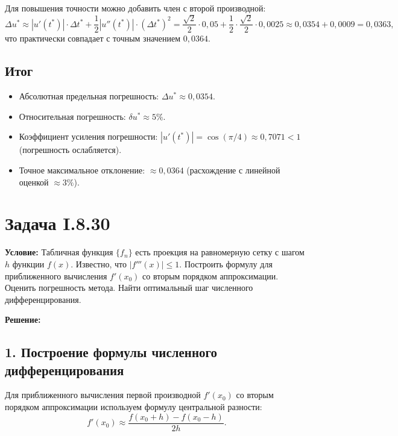 \documentclass{article}
\begin{document}
Для повышения точности можно добавить член с второй производной:
\begin{equation}
\Delta u^* \approx |u'(t^*)| \cdot \Delta t^* + \frac{1}{2}|u''(t^*)| \cdot (\Delta t^*)^2 = \frac{\sqrt{2}}{2} \cdot 0{,}05 + \frac{1}{2} \cdot \frac{\sqrt{2}}{2} \cdot 0{,}0025 \approx 0{,}0354 + 0{,}0009 = 0{,}0363,
\end{equation}
что практически совпадает с точным значением $0{,}0364$.

\subsection*{Итог}

\begin{itemize}
\item Абсолютная предельная погрешность: $\Delta u^* \approx 0{,}0354$.
\item Относительная погрешность: $\delta u^* \approx 5\%$.
\item Коэффициент усиления погрешности: $|u'(t^*)| = \cos(\pi/4) \approx 0{,}7071 < 1$ (погрешность ослабляется).
\item Точное максимальное отклонение: $\approx 0{,}0364$ (расхождение с линейной оценкой $\approx 3\%$).
\end{itemize}












\section*{Задача I.8.30}

\textbf{Условие:} Табличная функция $\{f_n\}$ есть проекция на равномерную сетку с шагом $h$ функции $f(x)$. Известно, что $|f'''(x)| \leq 1$. Построить формулу для приближенного вычисления $f'(x_0)$ со вторым порядком аппроксимации. Оценить погрешность метода. Найти оптимальный шаг численного дифференцирования.

\vspace{0.5cm}
\textbf{Решение:}

\subsection*{1. Построение формулы численного дифференцирования}

Для приближенного вычисления первой производной $f'(x_0)$ со вторым порядком аппроксимации используем формулу центральной разности:
\begin{equation}
f'(x_0) \approx \frac{f(x_0 + h) - f(x_0 - h)}{2h}.
\label{eq:central_diff}
\end{equation}
\end{document}
